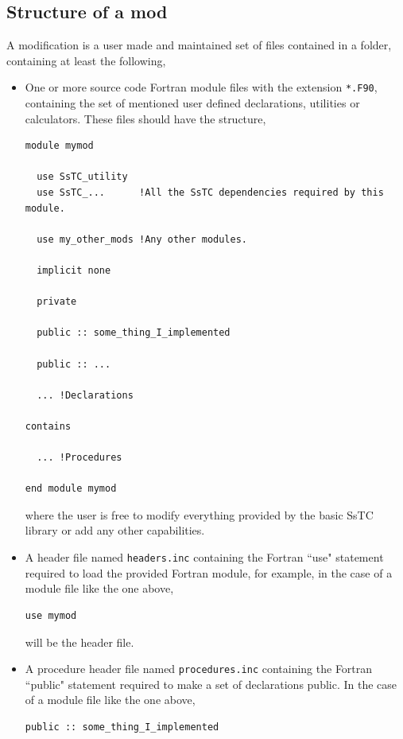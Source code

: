 \documentclass[10pt,a4paper]{article}
\begin{document}
\subsection{Structure of a mod}\label{sec:mod_structure}
A modification is a user made and maintained set of files contained in a folder, containing at least the following,
\begin{tcolorbox}
\begin{itemize}
\item One or more source code Fortran module files with the extension \verb|*.F90|, containing the set of mentioned user defined declarations, utilities or calculators. These files should have the structure,
\begin{codebox}{}
\begin{lstlisting}[caption={Structure of user made ``mod" files.},captionpos=b]
module mymod

  use SsTC_utility
  use SsTC_...      !All the SsTC dependencies required by this module.
  
  use my_other_mods !Any other modules.

  implicit none

  private

  public :: some_thing_I_implemented

  public :: ...
  
  ... !Declarations

contains

  ... !Procedures

end module mymod
\end{lstlisting}
\end{codebox}
where the user is free to modify everything provided by the basic SsTC library or add any other capabilities.
\item A header file named \verb|headers.inc| containing the Fortran ``use" statement required to load the provided Fortran module, for example, in the case of a module file like the one above,
\begin{codebox}{}
\begin{lstlisting}[caption={Header file.},captionpos=b]
  use mymod
\end{lstlisting}
\end{codebox}
will be the header file.
\item A procedure header file named \verb|procedures.inc| containing the Fortran ``public" statement required to make a set of declarations public. In the case of a module file like the one above,
\begin{codebox}{}
\begin{lstlisting}[caption={Header file.},captionpos=b]
  public :: some_thing_I_implemented


\end{lstlisting}
\end{codebox}
\end{itemize}
\end{tcolorbox}
\end{document}
